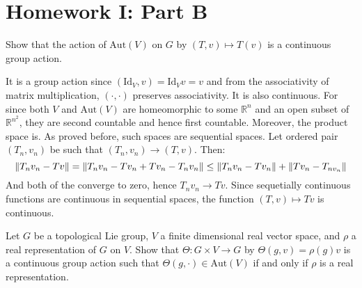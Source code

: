 \documentclass{article}                                                        %
\begin{document}
    \section{Homework I: Part B}
        \begin{problem}
            Show that the action of $\textrm{Aut}(V)$ on $G$ by
            $(T,v)\mapsto{T}(v)$ is a continuous group action.
        \end{problem}
        \begin{solution}
            It is a group action since $(\textrm{Id}_{V},v)=\textrm{Id}_{V}v=v$
            and from the associativity of matrix multiplication, $(\cdot,\cdot)$
            preserves associativity. It is also continuous. For since
            both $V$ and $\textrm{Aut}(V)$ are homeomorphic to some
            $\mathbb{R}^{n}$ and an open subset of $\mathbb{R}^{n^{2}}$, they
            are second countable and hence first countable. Moreover, the
            product space is. As proved before, such spaces are sequential
            spaces. Let ordered pair $(T_{n},v_{n})$ be such that
            $(T_{n},v_{n})\rightarrow(T,v)$. Then:
            \begin{equation}
                \lVert T_{n}v_{n}-Tv\rVert=
                \lVert T_{n}v_{n}-Tv_{n}+Tv_{n}-T_{n}v_{n}\rVert
                \leq\lVert T_{n}v_{n}-Tv_{n}\rVert+\lVert Tv_{n}-T_{nv_{n}}\rVert
            \end{equation}
            And both of the converge to zero, hence $T_{n}v_{n}\rightarrow{T}v$.
            Since sequetially continuous functions are continuous in sequential
            spaces, the function $(T,v)\mapsto{T}v$ is continuous.
        \end{solution}
        \begin{problem}
            Let $G$ be a topological Lie group, $V$ a finite dimensional real
            vector space, and $\rho$ a real representation of $G$ on $V$. Show
            that $\Theta:G\times{V}\rightarrow{G}$ by
            $\Theta(g,v)=\rho(g)v$ is a continuous group action such that
            $\Theta(g,\cdot)\in\textrm{Aut}(V)$ if and only if $\rho$ is a
            real representation.
        \end{problem}
\end{document}
